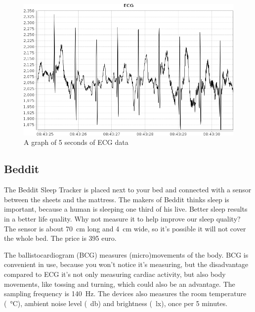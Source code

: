 			\begin{figure}[h]
				\label{fig:ecg}
				\centering
					\includegraphics[scale=0.5]{ecg.png}
					
				\caption{A graph of 5 seconds of ECG data}

			\end{figure}
			


	\subsection{Beddit}
		The Beddit Sleep Tracker is placed next to your bed and connected with a sensor between the sheets and the mattress. The makers of Beddit thinks sleep is important, because a human is sleeping one third of his live. Better sleep results in a better life quality. Why not measure it to help improve our sleep quality? The sensor is about \SI{70}{\centi\metre} long and \SI{4}{\centi\metre} wide, so it's possible it will not cover the whole bed. 
			The price is 395 euro.

			The ballistocardiogram (BCG) measures (micro)movements of the body.\cite{beddit}
			BCG is convenient in use, because you won't notice it's measuring, but the disadvantage compared to ECG it's not only measuring cardiac activity, but also body movements, like tossing and turning, which could also be an advantage.\cite{bcg} The sampling frequency is \SI{140}{\hertz}. The devices also measures the room temperature (\SI{}{\celsius}), ambient noise level (\SI{}{\decibel}) and brightness (\SI{}{\lux}), once per 5 minutes.\cite{bedditapi}


